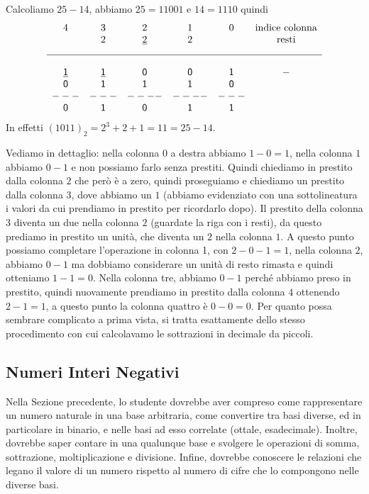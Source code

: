 \begin{ex}
Calcoliamo $25-14$, abbiamo $25 = 11001$ e $14 = 1110$ quindi 
\[
\begin{matrix}
 4 & 3 &   2   & 1 & 0 & \text{indice colonna}\\
   & 2  & \underline{2} & 2 &   & \text{resti}\\[2ex]
\hline\\
 \underline{\mathsf 1} & \underline{\mathsf 1} & \mathsf 0  & \mathsf 0 & \mathsf 1 & \mathsf-\\
 \mathsf 0 & \mathsf 1 & \mathsf 1  & \mathsf 1 & \mathsf 0 & \\
---&---&----&----&---& \\
 \mathsf 0 & \mathsf 1 & \mathsf 0 & \mathsf 1 & \mathsf 1 &
\end{matrix}
\]
In effetti $(1011)_2 = 2^3+2+1 = 11 = 25-14$.
\end{ex}

Vediamo in dettaglio: nella colonna $0$ a destra abbiamo $1-0 = 1$,
nella colonna $1$ abbiamo $0-1$ e non possiamo farlo senza prestiti.
Quindi chiediamo in prestito dalla colonna $2$ che però è a zero, quindi proseguiamo e chiediamo un prestito dalla colonna $3$, dove abbiamo un $1$ (abbiamo evidenziato con una sottolineatura i valori da cui prendiamo in prestito per ricordarlo dopo).
Il prestito della colonna $3$ diventa un due nella colonna $2$ (guardate la riga con i resti), da questo prediamo in prestito un unità, che diventa un $2$ nella colonna $1$.
A questo punto possiamo completare l'operazione in colonna 1, con $2-0-1 = 1$,
nella colonna $2$, abbiamo $0 - 1$ ma dobbiamo considerare un unità di resto rimasta e quindi otteniamo $1 - 1 = 0$. Nella colonna tre, abbiamo $0-1$ perché abbiamo preso in prestito, quindi nuovamente prendiamo in prestito dalla colonna $4$ ottenendo $2-1 = 1$, a questo punto la colonna quattro è $0-0=0$.
Per quanto possa sembrare complicato a prima vista, si tratta esattamente
dello stesso procedimento con cui calcolavamo le sottrazioni in decimale da piccoli.


\subsection{Numeri Interi Negativi}

Nella Sezione precedente, lo studente dovrebbe aver compreso come rappresentare
un numero naturale in una base arbitraria, come convertire tra basi diverse, ed
in particolare in binario, e nelle basi ad esso correlate (ottale,
esadecimale). Inoltre, dovrebbe saper contare in una qualunque base e svolgere
le operazioni di somma, sottrazione, moltiplicazione e divisione. Infine,
dovrebbe conoscere le relazioni che legano il valore di un numero rispetto al
numero di cifre che lo compongono nelle diverse basi.


